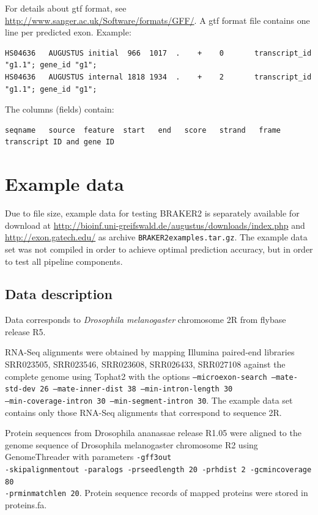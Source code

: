 \documentclass[a4paper,10pt]{report}
\begin{document}
For details about gtf format, see \url{http://www.sanger.ac.uk/Software/formats/GFF/}. A gtf format file
contains one line per predicted exon. Example:

\begin{verbatim}
HS04636   AUGUSTUS initial  966  1017  .    +    0       transcript_id "g1.1"; gene_id "g1";
HS04636   AUGUSTUS internal 1818 1934  .    +    2       transcript_id "g1.1"; gene_id "g1";
\end{verbatim}

The columns (fields) contain: 

\begin{verbatim}
seqname   source  feature  start   end   score   strand   frame  transcript ID and gene ID
\end{verbatim}


\chapter{Example data}


Due to file size, example data for testing BRAKER2 is separately available for download at 
\url{http://bioinf.uni-greifswald.de/augustus/downloads/index.php} and \url{http://exon.gatech.edu/} as archive
\texttt{BRAKER2examples.tar.gz}. The example data set was not compiled in order to achieve optimal prediction accuracy, but in order to test all pipeline components.

\section{Data description}

Data corresponds to \textit{Drosophila melanogaster} chromosome 2R from flybase release R5. 

RNA-Seq alignments were obtained by mapping Illumina paired-end libraries SRR023505, SRR023546, 
SRR023608, SRR026433, SRR027108 against the complete genome using Tophat2 with the options 
\texttt{--microexon-search   --mate-std-dev 26   --mate-inner-dist 38  --min-intron-length 30 \\ 
--min-coverage-intron 30 --min-segment-intron 30}.
The example data set contains only those RNA-Seq alignments that correspond to sequence 2R.

Protein sequences from Drosophila ananassae release R1.05 were aligned to the genome sequence of
Drosophila melanogaster chromosome R2 using GenomeThreader with parameters
\texttt{-gff3out \\-skipalignmentout -paralogs -prseedlength 20 -prhdist 2 -gcmincoverage 80 \\
-prminmatchlen 20}.
Protein sequence records of mapped proteins were stored in proteins.fa. 
\end{document}
